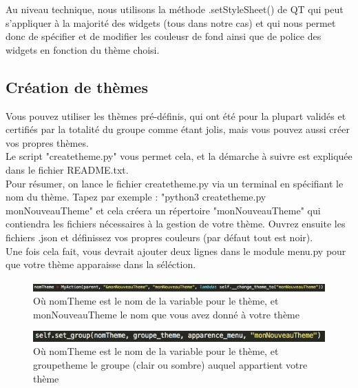 \documentclass[a4paper,12pt]{article}
\begin{document}
			Au niveau technique, nous utilisons la méthode .setStyleSheet() de QT qui peut s'appliquer à la majorité des widgets (tous dans notre cas) et qui nous permet donc de spécifier et de modifier les couleusr de fond ainsi que de police des widgets en fonction du thème choisi.
			
		\subsection{Création de thèmes}
		
			Vous pouvez utiliser les thèmes pré-définis, qui ont été pour la plupart validés et certifiés par la totalité du groupe comme étant jolis, mais vous pouvez aussi créer vos propres thèmes.\\
			
			Le script "createtheme.py" vous permet cela, et la démarche à suivre est expliquée dans le fichier README.txt.\\
			
			Pour résumer, on lance le fichier createtheme.py via un terminal en spécifiant le nom du thème. Tapez par exemple :
			"python3 createtheme.py monNouveauTheme" et cela créera un répertoire "monNouveauTheme" qui contiendra les fichiers nécessaires à la gestion de votre thème. Ouvrez ensuite les fichiers .json et définissez vos propres couleurs (par défaut tout est noir).\\
			
			Une fois cela fait, vous devrait ajouter deux lignes dans le module menu.py pour que votre thème apparaisse dans la séléction.

			\begin{figure}[h!]
				\begin{center}
					\includegraphics[scale=0.5]{imgs/add2}
					\caption{Où nomTheme est le nom de la variable pour le thème, et monNouveauTheme le nom que vous avez donné à votre thème}
				\end{center}
			\end{figure}
			\begin{figure}[h!]
				\begin{center}
					\includegraphics[scale=0.7]{imgs/add1}
					\caption{Où nomTheme est le nom de la variable pour le thème, et groupetheme le groupe (clair ou sombre) auquel appartient votre thème}
				\end{center}
			\end{figure}
			
\end{document}
